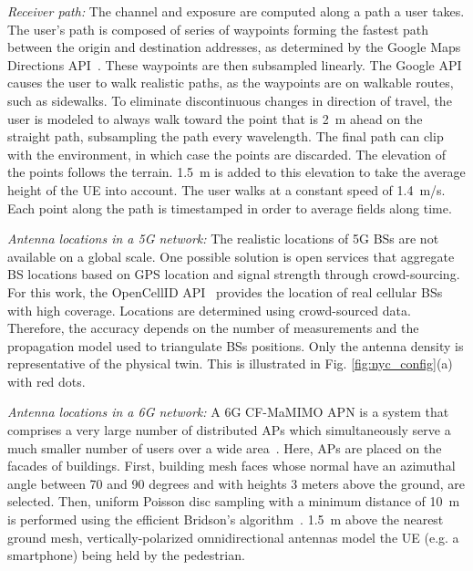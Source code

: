 \documentclass{IEEEtran}
\begin{document}
\textit{Receiver path:} The channel and exposure are computed along a path a user takes. The user's path is composed of series of waypoints forming the fastest path between the origin and destination addresses, as determined by the Google Maps Directions API~\cite{DirectionsAPI}. These waypoints are then subsampled linearly. The Google API causes the user to walk realistic paths, as the waypoints are on walkable routes, such as sidewalks. To eliminate discontinuous changes in direction of travel, the user is modeled to always walk toward the point that is 2~m ahead on the straight path, subsampling the path every wavelength. The final path can clip with the environment, in which case the points are discarded. The elevation of the points follows the terrain. 1.5~m is added to this elevation to take the average height of the \gls{UE} into account. The user walks at a constant speed of 1.4~m/s. Each point along the path is timestamped in order to average fields along time.

\textit{Antenna locations in a 5G network:} The realistic locations of 5G \glspl{BS} are not available on a global scale. One possible solution is open services that aggregate \gls{BS} locations based on GPS location and signal strength through crowd-sourcing. For this work, the OpenCellID API~\cite{OpenCellID} provides the location of real cellular \glspl{BS} with high coverage. Locations are determined using crowd-sourced data. Therefore, the accuracy depends on the number of measurements and the propagation model used to triangulate \glspl{BS} positions. Only the antenna density is representative of the physical twin. This is illustrated in Fig. \ref{fig:nyc_config}(a) with red dots.

\textit{Antenna locations in a 6G network:} A \gls{6G} \gls{CF-MaMIMO} \gls{APN} is a system that comprises a very large number of
distributed \glspl{AP} which simultaneously serve a much smaller number of users over a wide area~\cite{Ngo2015, Ngo2017}. Here, \glspl{AP} are placed on the facades of buildings. First, building mesh faces whose normal have an azimuthal angle between 70 and 90 degrees and with heights 3 meters above the ground, are selected. Then, uniform Poisson disc sampling with a minimum distance of 10~m is performed using the efficient Bridson’s algorithm~\cite{Bridson}. 1.5~m above the nearest ground mesh, vertically-polarized omnidirectional antennas model the \gls{UE} (e.g. a smartphone) being held by the pedestrian. 
\end{document}
